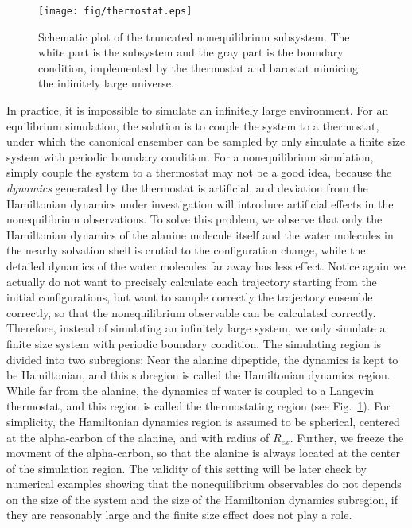 \documentclass[aip,jcp,a4paper,preprint,onecolumn]{revtex4-1}
\begin{document}
\begin{figure}
  \centering
  \texttt{[image: fig/thermostat.eps]}
  \caption{Schematic plot of the truncated nonequilibrium subsystem.
    The white part is the subsystem and the gray part is the boundary
    condition, implemented by the thermostat and barostat mimicing
    the infinitely large universe.}
  \label{fig:tmp2}
\end{figure}

In practice, it is impossible to simulate an infinitely large
environment.  For an equilibrium simulation, the solution is to couple
the system to a thermostat, under which the canonical ensember can be
sampled by only simulate a finite size system with periodic boundary
condition. For a nonequilibrium simulation, simply couple the system
to a thermostat may not be a good idea, because the \emph{dynamics}
generated by the thermostat is artificial, and deviation from the
Hamiltonian dynamics under investigation will introduce artificial
effects in the nonequilibrium observations. To solve this problem, we
observe that only the Hamiltonian dynamics of the alanine molecule
itself and the water molecules in the nearby solvation shell is
crutial to the configuration change, while the detailed dynamics of
the water molecules far away has less effect. Notice again we actually
do not want to precisely calculate each trajectory starting from the
initial configurations, but want to sample correctly the trajectory
ensemble correctly, so that the nonequilibrium observable can be
calculated correctly.  Therefore, instead of simulating an infinitely
large system, we only simulate a finite size system with periodic
boundary condition. The simulating region is divided into two
subregions: Near the alanine dipeptide, the dynamics is kept to be
Hamiltonian, and this subregion is called the Hamiltonian dynamics
region. While far from the alanine, the dynamics of water is coupled
to a Langevin thermostat, and this region is called the thermostating
region (see Fig.~\ref{fig:tmp2}).  For simplicity, the Hamiltonian
dynamics region is assumed to be spherical, centered at the
alpha-carbon of the alanine, and with radius of $R_{ex}$.  Further, we
freeze the movment of the alpha-carbon, so that the alanine is always
located at the center of the simulation region.  The validity of this
setting will be later check by numerical examples showing that the
nonequilibrium observables do not depends on the size of the system
and the size of the Hamiltonian dynamics subregion, if they are
reasonably large and the finite size effect does not play a role.
\end{document}
